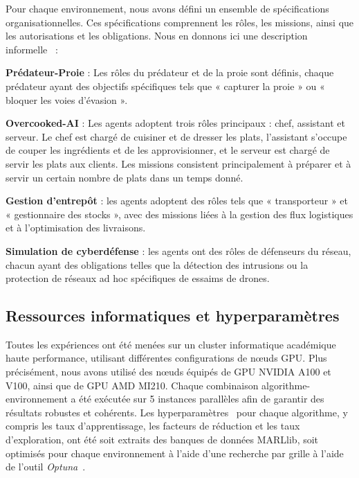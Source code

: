 Pour chaque environnement, nous avons défini un ensemble de spécifications organisationnelles. Ces spécifications comprennent les rôles, les missions, ainsi que les autorisations et les obligations. Nous en donnons ici une description informelle~\hyperref[fn:github]{\footnotemark[1]} :
%
\begin{enumerate*}[label={\roman*) },itemjoin={; \quad}]

    \item \textbf{Prédateur-Proie} : Les rôles du prédateur et de la proie sont définis, chaque prédateur ayant des objectifs spécifiques tels que « capturer la proie » ou « bloquer les voies d'évasion ».

    \item \textbf{Overcooked-AI} : Les agents adoptent trois rôles principaux : chef, assistant et serveur. Le chef est chargé de cuisiner et de dresser les plats, l'assistant s'occupe de couper les ingrédients et de les approvisionner, et le serveur est chargé de servir les plats aux clients. Les missions consistent principalement à préparer et à servir un certain nombre de plats dans un temps donné.



    \item \textbf{Gestion d'entrepôt} : les agents adoptent des rôles tels que « transporteur » et « gestionnaire des stocks », avec des missions liées à la gestion des flux logistiques et à l'optimisation des livraisons.



    \item \textbf{Simulation de cyberdéfense} : les agents ont des rôles de défenseurs du réseau, chacun ayant des obligations telles que la détection des intrusions ou la protection de réseaux ad hoc spécifiques de essaims de drones.
\end{enumerate*}

\subsection{Ressources informatiques et hyperparamètres}

Toutes les expériences ont été menées sur un cluster informatique académique haute performance, utilisant différentes configurations de nœuds GPU. Plus précisément, nous avons utilisé des nœuds équipés de GPU NVIDIA A100 et V100, ainsi que de GPU AMD MI210. Chaque combinaison algorithme-environnement a été exécutée sur 5 instances parallèles afin de garantir des résultats robustes et cohérents.
%
Les hyperparamètres~\hyperref[fn:github]{\footnotemark[1]} pour chaque algorithme, y compris les taux d'apprentissage, les facteurs de réduction et les taux d'exploration, ont été soit extraits des banques de données MARLlib, soit optimisés pour chaque environnement à l'aide d'une recherche par grille à l'aide de l'outil \textit{Optuna}~\cite{akiba2019optuna}.

